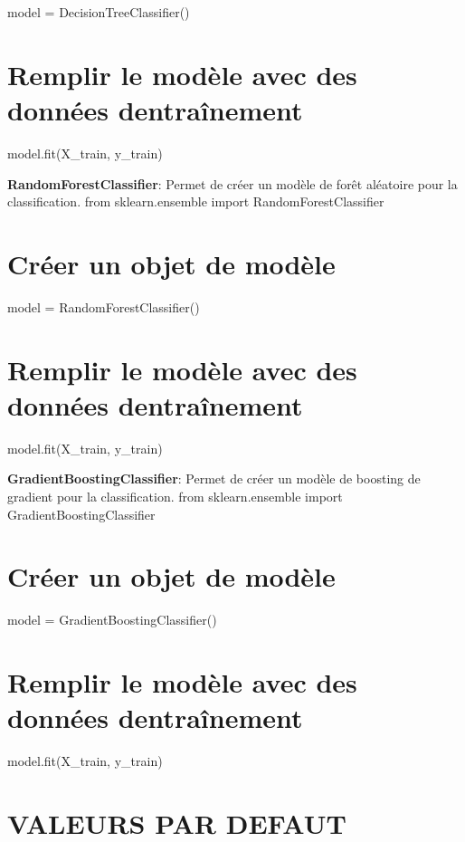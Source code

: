 model = Decision\+Tree\+Classifier() \section*{Remplir le modèle avec des données d\textquotesingle{}entraînement}

model.\+fit(\+X\+\_\+train, y\+\_\+train)


\begin{DoxyEnumerate}
\item {\bfseries Random\+Forest\+Classifier}\+: Permet de créer un modèle de forêt aléatoire pour la classification. from sklearn.\+ensemble import Random\+Forest\+Classifier \section*{Créer un objet de modèle}
\end{DoxyEnumerate}

model = Random\+Forest\+Classifier() \section*{Remplir le modèle avec des données d\textquotesingle{}entraînement}

model.\+fit(\+X\+\_\+train, y\+\_\+train)


\begin{DoxyEnumerate}
\item {\bfseries Gradient\+Boosting\+Classifier}\+: Permet de créer un modèle de boosting de gradient pour la classification. from sklearn.\+ensemble import Gradient\+Boosting\+Classifier \section*{Créer un objet de modèle}
\end{DoxyEnumerate}

model = Gradient\+Boosting\+Classifier() \section*{Remplir le modèle avec des données d\textquotesingle{}entraînement}

model.\+fit(\+X\+\_\+train, y\+\_\+train)

\section*{V\+A\+L\+E\+U\+RS P\+AR D\+E\+F\+A\+UT}

